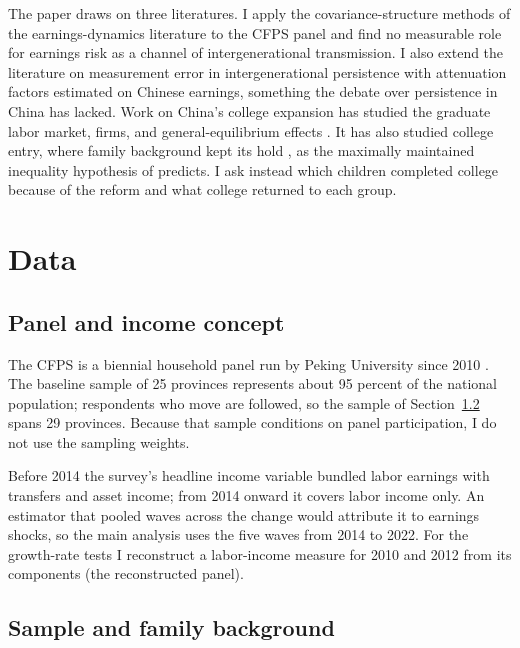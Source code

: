 \documentclass[11pt]{article}
\begin{document}
The paper draws on three literatures. I apply the covariance-structure methods of the earnings-dynamics literature \citep{LillardWillis1978, MaCurdy1982, HallMishkin1982, AbowdCard1989, MeghirPistaferri2004, ArellanoBlundellBonhomme2017} to the CFPS panel and find no measurable role for earnings risk as a channel of intergenerational transmission. I also extend the literature on measurement error in intergenerational persistence \citep{Solon1992, Zimmerman1992, Mazumder2005, HaiderSolon2006} with attenuation factors estimated on Chinese earnings, something the debate over persistence in China \citep{GongLeighMeng2012, DengGustafssonLi2013, FanYiZhang2021, YuanLin2013} has lacked. Work on China's college expansion has studied the graduate labor market, firms, and general-equilibrium effects \citep{CheZhang2018, KnightDengLi2017, Ma2024IER}. It has also studied college entry, where family background kept its hold \citep{Yeung2013}, as the maximally maintained inequality hypothesis of \citet{RafteryHout1993} predicts. I ask instead which children completed college because of the reform and what college returned to each group. 

\section{Data}
\label{sec:data}

\subsection{Panel and income concept}
\label{sec:income}

The CFPS is a biennial household panel run by Peking University since 2010 \citep{XieHu2014}. The baseline sample of 25 provinces represents about 95 percent of the national population; respondents who move are followed, so the sample of Section~\ref{sec:sample} spans 29 provinces. Because that sample conditions on panel participation, I do not use the sampling weights.

Before 2014 the survey's headline income variable bundled labor earnings with transfers and asset income; from 2014 onward it covers labor income only. An estimator that pooled waves across the change would attribute it to earnings shocks, so the main analysis uses the five waves from 2014 to 2022. For the growth-rate tests I reconstruct a labor-income measure for 2010 and 2012 from its components (the reconstructed panel).

\subsection{Sample and family background}
\label{sec:sample}
\end{document}
